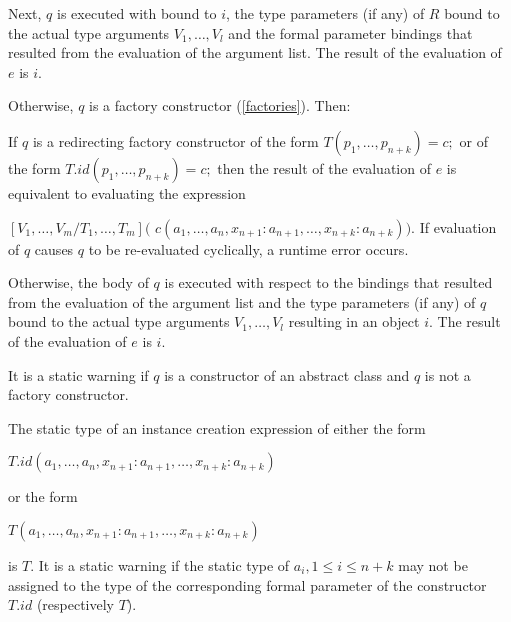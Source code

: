 \documentclass{article}
\newcommand{\code}[1]{{\sf #1}}
\begin{document}

\LMHash{}
Next,  $q$ is executed  with \THIS{} bound to $i$,  the type parameters (if any) of $R$ bound to the actual type arguments $V_1, \ldots, V_l$ and the formal parameter bindings that resulted from the evaluation of the argument list. The result of the evaluation of $e$ is $i$.

\LMHash{}
Otherwise, $q$ is a factory constructor (\ref{factories}). Then:

\LMHash{}
If $q$ is a redirecting factory constructor of the form $T(p_1, \ldots, p_{n+k}) = c;$ or of the form  $T.id(p_1, \ldots, p_{n+k}) = c;$ then the result of the evaluation of $e$ is equivalent to evaluating the expression

$[V_1,  \ldots, V_m/T_1,  \ldots, T_m]($\code{\NEW{} $c(a_1, \ldots, a_n, x_{n+1}: a_{n+1}, \ldots, x_{n+k}: a_{n+k}))$}.  If evaluation of $q$ causes $q$ to be re-evaluated cyclically, a runtime error occurs.


\LMHash{}
Otherwise, the body of $q$ is executed with respect to the bindings that resulted from the evaluation of the argument list and the type parameters (if any) of $q$ bound to the actual type arguments $V_1, \ldots, V_l$ resulting in an object $i$. The result of the evaluation of $e$ is $i$.

\LMHash{}
It is a static warning if $q$ is a constructor of an abstract class and $q$ is not a factory constructor.



\LMHash{}
The static type of an instance creation expression of either the form

\NEW{} $T.id(a_1, \ldots , a_n, x_{n+1}: a_{n+1}, \ldots , x_{n+k}: a_{n+k})$

or the form

\NEW{} $T(a_1, \ldots , a_n, x_{n+1}: a_{n+1}, \ldots , x_{n+k}: a_{n+k})$

is $T$.
It is a static warning if the static type of $a_i, 1 \le i \le n+ k$ may not be assigned to the type of the corresponding formal parameter of the constructor $T.id$ (respectively $T$).
\end{document}
